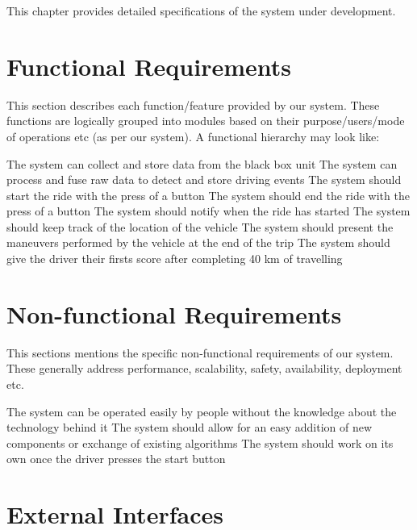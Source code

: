 
This chapter provides detailed specifications of the system under development.

\section{Functional Requirements}

This section describes each function/feature provided by our system. These functions are logically grouped into modules based on their purpose/users/mode of operations etc (as per our system). A functional hierarchy may look like:
\begin{outline}


\1 The system can collect and store data from the black box unit
\1 The system can process and fuse raw data to detect and store driving events
\1 The system should start the ride with the press of a button
\1 The system should end the ride with the press of a button
\1 The system should notify when the ride has started
\1 The system should keep track of the location of the vehicle
\1 The system should present the maneuvers performed by the vehicle at the end of the trip
\1 The system should give the driver their firsts score after completing 40 km of travelling

  
\end{outline}


\section{Non-functional Requirements}

This sections mentions the specific non-functional requirements of our system. These generally address performance, scalability, safety, availability, deployment etc.

\begin{outline}
\1 The system can be operated easily by people without the knowledge about the technology behind it
\1 The system should allow for an easy addition of new components or exchange of existing algorithms
\1 The system should work on its own once the driver presses the start button
\end{outline}

\section{External Interfaces}

